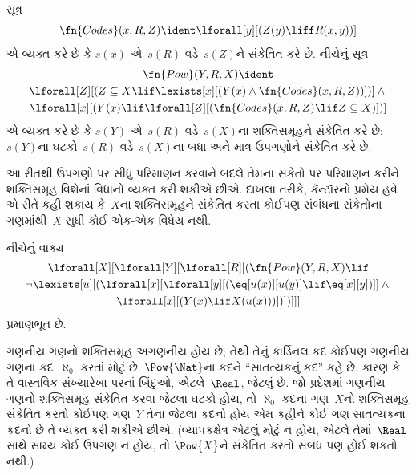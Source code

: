 \begin{prop}
સૂત્ર
  \[
  \fn{Codes}(x, R, Z) \ident \lforall[y][(Z(y) \liff
    R(x, y))]
  \]
એ વ્યક્ત કરે છે કે $s(x)$ એ~$s(R)$ વડે~$s(Z)$ને સંકેતિત કરે છે.
નીચેનું સૂત્ર
\begin{multline*}
  \fn{Pow}(Y, R, X) \ident \\
  \lforall[Z][(Z \subseteq X \lif \lexists[x][(Y(x) \land
    \fn{Codes}(x, R, Z))])] \land {} \\ \lforall[x][(Y(x) \lif
  \lforall[Z][(\fn{Codes}(x, R, Z) \lif Z \subseteq X)])]
\end{multline*}
એ વ્યક્ત કરે છે કે $s(Y)$ એ~$s(R)$ વડે~$s(X)$ના શક્તિસમૂહને
સંકેતિત કરે છે: $s(Y)$ના ઘટકો~$s(R)$ વડે~$s(X)$ના બધા અને માત્ર
ઉપગણોને સંકેતિત કરે છે.
\end{prop}

\begin{explain}
આ રીતથી ઉપગણો પર સીધું પરિમાણન કરવાને બદલે તેમના સંકેતો પર
પરિમાણન કરીને શક્તિસમૂહ વિશેનાં વિધાનો વ્યક્ત કરી શકીએ છીએ.
દાખલા તરીકે, કૅન્ટૉરનો પ્રમેય હવે એ રીતે કહી શકાય કે~$X$ના
શક્તિસમૂહને સંકેતિત કરતા કોઈપણ સંબંધના સંકેતોના ગણમાંથી~$X$
સુધી કોઈ એક-એક વિધેય નથી.
\end{explain}

\begin{prop}
નીચેનું વાક્ય
\begin{multline*}
  \lforall[X][\lforall[Y][\lforall[R][(\fn{Pow}(Y, R, X) \lif \\
      \lnot \lexists[u][(\lforall[x][\lforall[y][(\eq[u(x)][u(y)] \lif
            \eq[x][y])]] \land {}\\
        \lforall[x][(Y(x) \lif X(u(x)))])])]]]
\end{multline*}
પ્રમાણભૂત છે.
\end{prop}

\begin{explain}
ગણનીય ગણનો શક્તિસમૂહ અગણનીય હોય છે;
તેથી તેનું કાર્ડિનલ કદ કોઈપણ ગણનીય ગણના કદ~$\aleph_0$
કરતાં મોટું છે. $\Pow{\Nat}$ના કદને ``સાતત્યકનું કદ'' કહે છે,
કારણ કે તે વાસ્તવિક સંખ્યારેખા પરનાં બિંદુઓ, એટલે~$\Real$, જેટલું
છે. જો પ્રદેશમાં ગણનીય ગણનો શક્તિસમૂહ સંકેતિત
કરવા જેટલા ઘટકો હોય, તો $\aleph_0$-કદના ગણ~$X$નો શક્તિસમૂહ
સંકેતિત કરતો કોઈપણ ગણ~$Y$ તેના જેટલા કદનો હોય એમ કહીને કોઈ ગણ
સાતત્યકના કદનો છે તે વ્યક્ત કરી શકીએ છીએ. (વ્યાપકક્ષેત્ર એટલું
મોટું ન હોય, એટલે તેમાં~$\Real$ સાથે સામ્ય કોઈ ઉપગણ ન હોય, તો
$\Pow{X}$ને સંકેતિત કરતો સંબંધ પણ હોઈ શકતો નથી.)
\end{explain}

